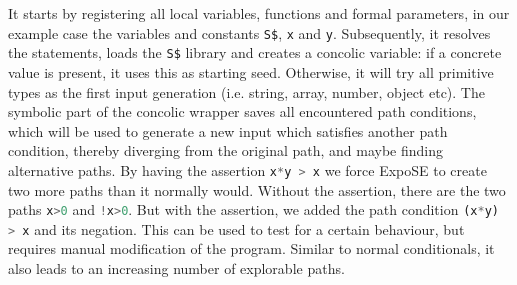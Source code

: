It starts by registering all local variables, functions and formal parameters, in our example case the variables and constants \lstinline[language=JavaScript]{S$}, \lstinline[language=JavaScript]{x} and \lstinline[language=JavaScript]{y}. Subsequently, it resolves the statements, loads the \lstinline[language=JavaScript]{S$} library and creates a concolic variable: if a concrete value is present, it uses this as starting seed. Otherwise, it will try all primitive types as the first input generation (i.e. string, array, number, object etc). The symbolic part of the concolic wrapper saves all encountered path conditions, which will be used to generate a new input which satisfies another path condition, thereby diverging from the original path, and maybe finding alternative paths.
By having the assertion \lstinline[language=JavaScript]{x*y > x} we force ExpoSE to create two more paths than it normally would. Without the assertion, there are the two paths \lstinline[language=JavaScript]{x>0} and \lstinline[language=JavaScript]{!x>0}. But with the assertion, we added the path condition \lstinline[language=JavaScript]{(x*y) > x} and its negation. This can be used to test for a certain behaviour, but requires manual modification of the program. Similar to normal conditionals, it also leads to an increasing number of explorable paths.




